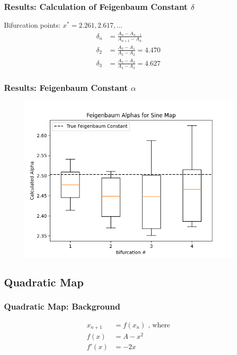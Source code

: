 \documentclass[
	11pt, %
	aspectratio=169, %
]{beamer}
\begin{document}

\begin{frame}
    \frametitle{Results: Calculation of Feigenbaum Constant $\delta$}
    Bifurcation points: $x^* = 2.261, 2.617, \dots$ \pause
    \begin{align*}
        \delta_{n} &= \frac{A_{n}-A_{n-1}}{A_{n+1}-A_{n}} \\
        \delta_{2} &= \frac{A_{2}-A_{1}}{A_{3}-A_{2}} = 4.470 \\
        \delta_{3} &= \frac{A_{3}-A_{2}}{A_{4}-A_{3}} = 4.627
    \end{align*}
\end{frame}


\begin{frame}
        \frametitle{Results: Feigenbaum Constant $\alpha$}
    \begin{figure}
        \includegraphics[width=0.6\linewidth]
        {sine_feigenbaum_alphas.png}
    \end{figure}
\end{frame}

\subsection{Quadratic Map}

\begin{frame}
        \frametitle{Quadratic Map: Background}
        \begin{align*}
            x_{n+1} &= f(x_n) \text{ , where}\\
            f(x) &= A - x^2 \\
            f'(x) &= -2x
        \end{align*}
\end{frame}
\end{document}
